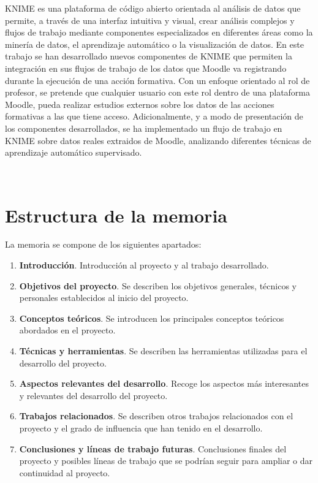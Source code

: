 KNIME \cite{BCDG+07} es una plataforma de código abierto orientada al análisis de datos que permite, a través de una interfaz intuitiva y visual, 
crear análisis complejos y flujos de trabajo mediante componentes especializados en diferentes áreas como la minería de datos, 
el aprendizaje automático o la visualización de datos. En este trabajo se han desarrollado nuevos componentes de KNIME que permiten la 
integración en sus flujos de trabajo de los datos que Moodle va registrando durante la ejecución de una acción formativa. 
Con un enfoque orientado al rol de profesor, se pretende que cualquier usuario con este rol dentro de una 
plataforma Moodle, pueda realizar estudios externos sobre los datos de las acciones formativas a las que tiene acceso. 
Adicionalmente, y a modo de presentación de los componentes desarrollados, se ha implementado un flujo de trabajo en KNIME 
sobre datos reales extraidos de Moodle, analizando diferentes técnicas de aprendizaje automático supervisado. 

\


\section{Estructura de la memoria}

La memoria se compone de los siguientes apartados: 
\

\begin{enumerate}
	\item \textbf{Introducción}. Introducción al proyecto y al trabajo desarrollado. 
	\item \textbf{Objetivos del proyecto}. Se describen los objetivos generales, técnicos y personales establecidos al inicio del proyecto.
	\item \textbf{Conceptos teóricos}. Se introducen los principales conceptos teóricos abordados en el proyecto. 
	\item \textbf{Técnicas y herramientas}. Se describen las herramientas utilizadas para el desarrollo del proyecto.
	\item \textbf{Aspectos relevantes del desarrollo}. Recoge los aspectos más interesantes y relevantes del desarrollo del proyecto.
	\item \textbf{Trabajos relacionados}. Se describen otros trabajos relacionados con el proyecto y el grado de influencia que han tenido en el desarrollo.
	\item \textbf{Conclusiones y líneas de trabajo futuras}. Conclusiones finales del proyecto y posibles líneas de trabajo que se podrían seguir para ampliar o dar continuidad al proyecto. 
\end{enumerate}


